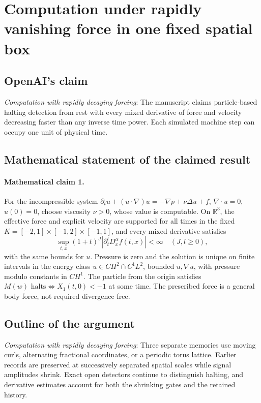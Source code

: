 \documentclass[11pt]{article}
\begin{document}
\section*{Computation under rapidly vanishing force in one fixed spatial box}

\subsection{OpenAI's claim}
\textit{Computation with rapidly decaying forcing}: The manuscript claims particle-based halting detection from rest with every mixed derivative of force and velocity decreasing faster than any inverse time power. Each simulated machine step can occupy one unit of physical time.

\subsection{Mathematical statement of the claimed result}
\paragraph{Mathematical claim 1.} For the incompressible system $\partial_tu+(u\cdot\nabla)u=-\nabla p+\nu\Delta u+f$, $\nabla\cdot u=0$, $u(0)=0$, choose viscosity $\nu>0$, whose value is computable. On $\mathbb R^3$, the effective force and explicit velocity are supported for all times in the fixed $K=[-2,1]\times[-1,2]\times[-1,1]$, and every mixed derivative satisfies \[\sup_{t,x}(1+t)^J|\partial_t^lD_x^\alpha f(t,x)|<\infty\quad(J,l\ge0),\] with the same bounds for $u$. Pressure is zero and the solution is unique on finite intervals in the energy class $u\in CH^2\cap C^1L^2$, bounded $u,\nabla u$, with pressure modulo constants in $CH^1$. The particle from the origin satisfies $M(w)\text{ halts}\Longleftrightarrow X_1(t,0)<-1$ at some time. The prescribed force is a general body force, not required divergence free.

\subsection{Outline of the argument}
\textit{Computation with rapidly decaying forcing}: Three separate memories use moving curls, alternating fractional coordinates, or a periodic torus lattice. Earlier records are preserved at successively separated spatial scales while signal amplitudes shrink. Exact open detectors continue to distinguish halting, and derivative estimates account for both the shrinking gates and the retained history.
\end{document}
